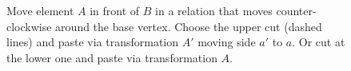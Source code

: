 \documentclass[Thesis]{subfiles}
\begin{document}
 \begin{figure}
 \centering
 \resizebox{0.3\textwidth}{!} {
 
 }
 \caption{Move element $A$ in front of $B$ in a relation that moves counter-clockwise around the base vertex. Choose the upper cut (dashed lines) and paste via transformation $A'$ moving side $a'$ to $a$. Or cut at the lower one and paste via transformation $A$.}
 \label{fig:cut-and-paste-motion}
 \end{figure}
%
%
%
%
%
\end{document}
